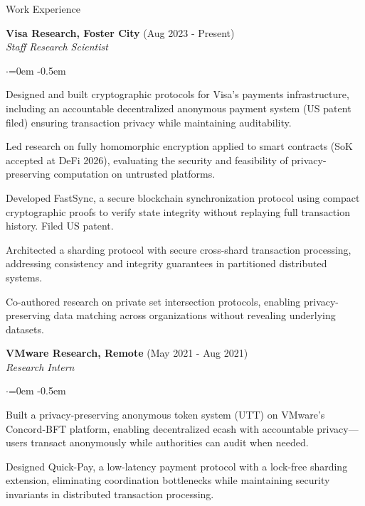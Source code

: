 \documentclass{resume}
\begin{document}
\begin{rSection}{Work Experience}
\label{sec:orgb5c6da2}

\textbf{Visa Research, Foster City}  \hfill  (Aug 2023 - Present)\\
\emph{Staff Research Scientist}
\begin{list}{$\cdot$}{\leftmargin=0em}
\itemsep -0.5em \vspace{-0.5em}
 \item  Designed and built cryptographic protocols for Visa's payments infrastructure, including an accountable decentralized anonymous payment system (US patent filed) ensuring transaction privacy while maintaining auditability.
 \item  Led research on fully homomorphic encryption applied to smart contracts (SoK accepted at DeFi 2026), evaluating the security and feasibility of privacy-preserving computation on untrusted platforms.
 \item  Developed FastSync, a secure blockchain synchronization protocol using compact cryptographic proofs to verify state integrity without replaying full transaction history. Filed US patent.
 \item  Architected a sharding protocol with secure cross-shard transaction processing, addressing consistency and integrity guarantees in partitioned distributed systems.
 \item  Co-authored research on private set intersection protocols, enabling privacy-preserving data matching across organizations without revealing underlying datasets.
\end{list}
\vspace{0.5em}

\textbf{VMware Research, Remote}  \hfill  (May 2021 - Aug 2021)\\
\emph{Research Intern}
\begin{list}{$\cdot$}{\leftmargin=0em}
\itemsep -0.5em \vspace{-0.5em}
 \item  Built a privacy-preserving anonymous token system (UTT) on VMware's Concord-BFT platform, enabling decentralized ecash with accountable privacy---users transact anonymously while authorities can audit when needed.
 \item  Designed Quick-Pay, a low-latency payment protocol with a lock-free sharding extension, eliminating coordination bottlenecks while maintaining security invariants in distributed transaction processing.
\end{list}
\vspace{0.5em}


\end{rSection}
\end{document}

